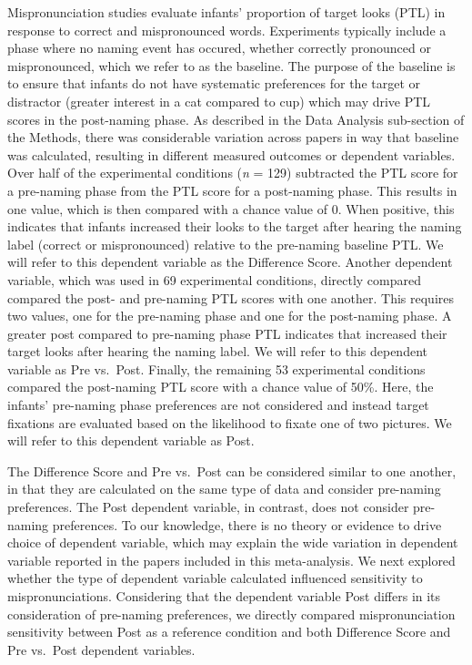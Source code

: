 \documentclass[man]{apa6}
\theoremstyle{definition}
\theoremstyle{definition}
\theoremstyle{definition}
\theoremstyle{remark}
\begin{document}
Mispronunciation studies evaluate infants' proportion of target looks
(PTL) in response to correct and mispronounced words. Experiments
typically include a phase where no naming event has occured, whether
correctly pronounced or mispronounced, which we refer to as the
baseline. The purpose of the baseline is to ensure that infants do not
have systematic preferences for the target or distractor (greater
interest in a cat compared to cup) which may drive PTL scores in the
post-naming phase. As described in the Data Analysis sub-section of the
Methods, there was considerable variation across papers in way that
baseline was calculated, resulting in different measured outcomes or
dependent variables. Over half of the experimental conditions (\emph{n}
= 129) subtracted the PTL score for a pre-naming phase from the PTL
score for a post-naming phase. This results in one value, which is then
compared with a chance value of 0. When positive, this indicates that
infants increased their looks to the target after hearing the naming
label (correct or mispronounced) relative to the pre-naming baseline
PTL. We will refer to this dependent variable as the Difference Score.
Another dependent variable, which was used in 69 experimental
conditions, directly compared compared the post- and pre-naming PTL
scores with one another. This requires two values, one for the
pre-naming phase and one for the post-naming phase. A greater post
compared to pre-naming phase PTL indicates that increased their target
looks after hearing the naming label. We will refer to this dependent
variable as Pre vs.~Post. Finally, the remaining 53 experimental
conditions compared the post-naming PTL score with a chance value of
50\%. Here, the infants' pre-naming phase preferences are not considered
and instead target fixations are evaluated based on the likelihood to
fixate one of two pictures. We will refer to this dependent variable as
Post.

The Difference Score and Pre vs.~Post can be considered similar to one
another, in that they are calculated on the same type of data and
consider pre-naming preferences. The Post dependent variable, in
contrast, does not consider pre-naming preferences. To our knowledge,
there is no theory or evidence to drive choice of dependent variable,
which may explain the wide variation in dependent variable reported in
the papers included in this meta-analysis. We next explored whether the
type of dependent variable calculated influenced sensitivity to
mispronunciations. Considering that the dependent variable Post differs
in its consideration of pre-naming preferences, we directly compared
mispronunciation sensitivity between Post as a reference condition and
both Difference Score and Pre vs.~Post dependent variables.
\end{document}
